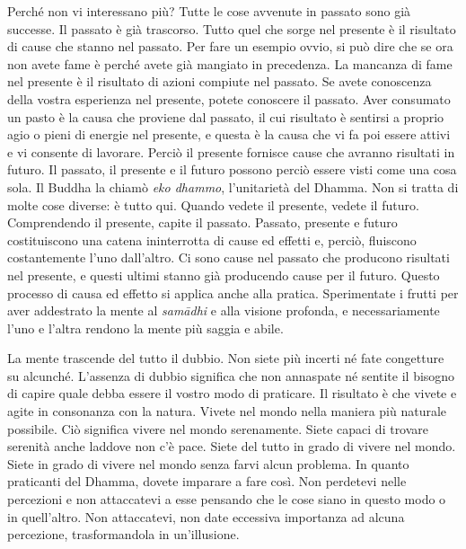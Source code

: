 Perché non vi interessano più? Tutte le cose avvenute in passato sono
già successe. Il passato è già trascorso. Tutto quel che sorge nel
presente è il risultato di cause che stanno nel passato. Per fare un
esempio ovvio, si può dire che se ora non avete fame è perché avete già
mangiato in precedenza. La mancanza di fame nel presente è il risultato
di azioni compiute nel passato. Se avete conoscenza della vostra
esperienza nel presente, potete conoscere il passato. Aver consumato un
pasto è la causa che proviene dal passato, il cui risultato è sentirsi a
proprio agio o pieni di energie nel presente, e questa è la causa che vi
fa poi essere attivi e vi consente di lavorare. Perciò il presente
fornisce cause che avranno risultati in futuro. Il passato, il presente
e il futuro possono perciò essere visti come una cosa sola. Il Buddha la
chiamò \emph{eko dhammo}, l'unitarietà del Dhamma. Non si tratta di
molte cose diverse: è tutto qui. Quando vedete il presente, vedete il
futuro. Comprendendo il presente, capite il passato. Passato, presente e
futuro costituiscono una catena ininterrotta di cause ed effetti e,
perciò, fluiscono costantemente l'uno dall'altro. Ci sono cause nel
passato che producono risultati nel presente, e questi ultimi stanno già
producendo cause per il futuro. Questo processo di causa ed effetto si
applica anche alla pratica. Sperimentate i frutti per aver addestrato la
mente al \emph{samādhi} e alla visione profonda, e necessariamente l'uno
e l'altra rendono la mente più saggia e abile.

La mente trascende del tutto il dubbio. Non siete più incerti né fate
congetture su alcunché. L'assenza di dubbio significa che non annaspate
né sentite il bisogno di capire quale debba essere il vostro modo di
praticare. Il risultato è che vivete e agite in consonanza con la
natura. Vivete nel mondo nella maniera più naturale possibile. Ciò
significa vivere nel mondo serenamente. Siete capaci di trovare serenità
anche laddove non c'è pace. Siete del tutto in grado di vivere nel
mondo. Siete in grado di vivere nel mondo senza farvi alcun problema. In
quanto praticanti del Dhamma, dovete imparare a fare così. Non perdetevi
nelle percezioni e non attaccatevi a esse pensando che le cose siano in
questo modo o in quell'altro. Non attaccatevi, non date eccessiva
importanza ad alcuna percezione, trasformandola in un'illusione.

